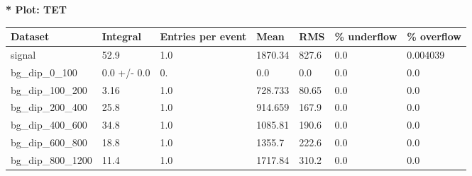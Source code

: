 \documentclass[a4paper, 10pt]{article}
\begin{document}
\textbf{* Plot: TET}\\
   \begin{table}[H]
  \begin{center}
    \begin{tabular}{|m{23.0mm}|m{23.0mm}|m{18.0mm}|m{19.0mm}|m{19.0mm}|m{19.0mm}|m{19.0mm}|}
      \hline
      {\cellcolor{yellow}         Dataset}& {\cellcolor{yellow}         Integral}& {\cellcolor{yellow}         Entries per event}& {\cellcolor{yellow}         Mean}& {\cellcolor{yellow}         RMS}& {\cellcolor{yellow}         \% underflow}& {\cellcolor{yellow}         \% overflow}\\
      \hline
      {\cellcolor{white}         signal}& {\cellcolor{white}         52.9}& {\cellcolor{white}         1.0}& {\cellcolor{white}         1870.34}& {\cellcolor{white}         827.6}& {\cellcolor{green}         0.0}& {\cellcolor{green}         0.004039}\\
      \hline
      {\cellcolor{white}         bg\_dip\_0\_100}& {\cellcolor{white}         0.0 +/\-- 0.0}& {\cellcolor{white}         0.}& {\cellcolor{white}         0.0}& {\cellcolor{white}         0.0}& {\cellcolor{green}         0.0}& {\cellcolor{green}         0.0}\\
      \hline
      {\cellcolor{white}         bg\_dip\_100\_200}& {\cellcolor{white}         3.16}& {\cellcolor{white}         1.0}& {\cellcolor{white}         728.733}& {\cellcolor{white}         80.65}& {\cellcolor{green}         0.0}& {\cellcolor{green}         0.0}\\
      \hline
      {\cellcolor{white}         bg\_dip\_200\_400}& {\cellcolor{white}         25.8}& {\cellcolor{white}         1.0}& {\cellcolor{white}         914.659}& {\cellcolor{white}         167.9}& {\cellcolor{green}         0.0}& {\cellcolor{green}         0.0}\\
      \hline
      {\cellcolor{white}         bg\_dip\_400\_600}& {\cellcolor{white}         34.8}& {\cellcolor{white}         1.0}& {\cellcolor{white}         1085.81}& {\cellcolor{white}         190.6}& {\cellcolor{green}         0.0}& {\cellcolor{green}         0.0}\\
      \hline
      {\cellcolor{white}         bg\_dip\_600\_800}& {\cellcolor{white}         18.8}& {\cellcolor{white}         1.0}& {\cellcolor{white}         1355.7}& {\cellcolor{white}         222.6}& {\cellcolor{green}         0.0}& {\cellcolor{green}         0.0}\\
      \hline
      {\cellcolor{white}         bg\_dip\_800\_1200}& {\cellcolor{white}         11.4}& {\cellcolor{white}         1.0}& {\cellcolor{white}         1717.84}& {\cellcolor{white}         310.2}& {\cellcolor{green}         0.0}& {\cellcolor{green}         0.0}\\

\end{tabular}
\end{center}
\end{table}
\end{document}
